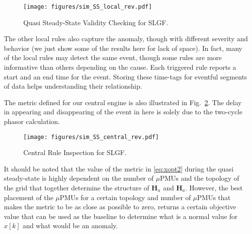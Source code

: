 \documentclass[twocolumn]{IEEEtran}
\newcommand{\mup}{\mu \text{PMU}}
\newcommand{\mb}{\mathbf}
\begin{document}
\begin{figure}[ht]
\centering 
\texttt{[image: figures/sim\_SS\_local\_rev.pdf]}
\caption{Quasi Steady-State Validity Checking for SLGF.}
\label{fig.sim_SS_local}
\end{figure} 
The other local rules also capture the anomaly, though with different severity and behavior (we just show some of the results here for lack of space). In fact, many of the local rules may detect the same event, though some rules are more informative than others depending on the cause. Each triggered rule reports a start and an end time for the event. Storing these time-tags for eventful segments of data helps understanding their relationship.

The metric defined for our central engine is also illustrated in Fig.~\ref{fig.sim_SS_cent}. The delay in appearing and disappearing of the event in here is solely due to the two-cycle phasor calculation.
\begin{figure}[ht]
\centering 
\texttt{[image: figures/sim\_SS\_central\_rev.pdf]}
\caption{Central Rule Inspection for SLGF.}
\label{fig.sim_SS_cent}
\end{figure} 

It should be noted that the value of the metric in \eqref{eq:xopt2} during the quasi steady-state is highly dependent on the number of $\mup$s and the topology of the grid that together determine the structure of $\mb{H}_u$ and $\mb{H}_a$. 
However, the best placement of the $\mup$s for a certain topology and number of $\mup$s that makes the metric to be as close as possible to zero, returns a certain objective value that can be used as the baseline to determine what is a normal value for $x[k]$ and what would be an anomaly.   
\end{document}
